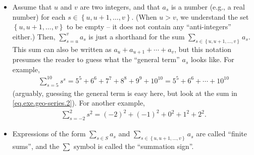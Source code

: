 \documentclass[paper=a4, fontsize=12pt]{scrartcl} %
\newcommand{\set}[1]{\left\{ #1 \right\}}
\newcommand{\tup}[1]{\left( #1 \right)}
\let\sumnonlimits\sum
\renewcommand{\sum}{\sumnonlimits\limits}
\theoremstyle{plainsl}
\theoremstyle{definition}
\theoremstyle{remark}
\begin{document}
\begin{itemize}
\item Assume that $u$ and $v$ are two integers, and that $a_s$
      is a number (e.g., a real number) for each
      $s \in \set{u, u+1, \ldots, v}$.
      (When $u > v$, we understand the set
      $\set{u, u+1, \ldots, v}$ to be empty -- it does not
      contain any ``anti-integers'' either.)
      Then, $\sum_{s = u}^v a_s$ is just a shorthand for
      the sum $\sum_{s \in \set{u, u+1, \ldots, v}} a_s$.
      This sum can also be written as
      $a_u + a_{u+1} + \cdots + a_v$, but this notation
      presumes the reader to guess what the ``general term''
      $a_s$ looks like.
      For example,
      \begin{align*}
      \sum_{s = 5}^{10} s^s
      = 5^5 + 6^6 + 7^7 + 8^8 + 9^9 + 10^{10}
      = 5^5 + 6^6 + \cdots + 10^{10}
      \end{align*}
      (arguably, guessing the general term is easy here,
      but look at the sum in \eqref{eq.exe.geo-series.2}).
      For another example,
      \begin{align*}
      \sum_{s = -2}^{2} s^2
      = \tup{-2}^2 + \tup{-1}^2 + 0^2 + 1^2 + 2^2 .
      \end{align*}

\item Expressions of the form $\sum_{s \in S} a_s$ and
      $\sum_{s \in \set{u, u+1, \ldots, v}} a_s$ are called
      ``finite sums'', and the $\sum$ symbol is called the
      ``summation sign''.


\end{itemize}
\end{document}

